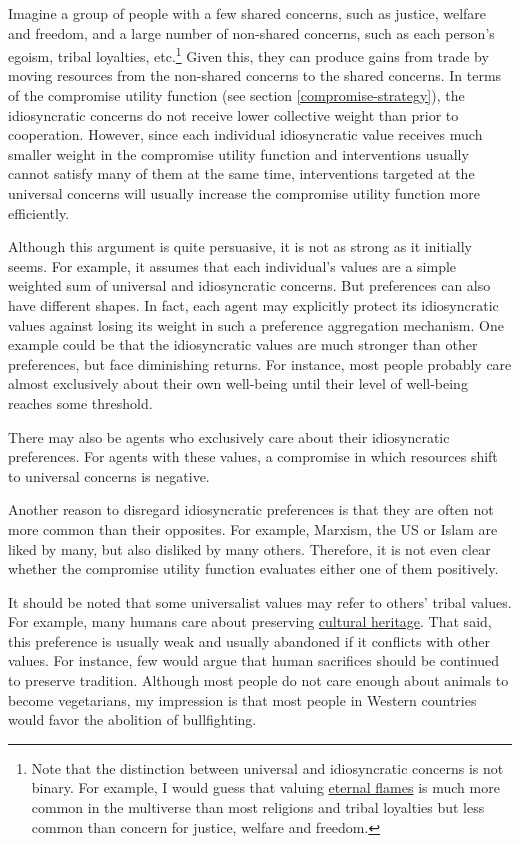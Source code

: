 Imagine a group of people with a few shared concerns, such as justice,
welfare and freedom, and a large number of non-shared concerns, such as
each person's egoism, tribal loyalties, etc.\footnote{Note that the
  distinction between universal and idiosyncratic concerns is not
  binary. For example, I would guess that valuing
  \href{https://en.wikipedia.org/wiki/Eternal_flame}{eternal
  flames} is much more common in the multiverse than most religions and
  tribal loyalties but less common than concern for justice, welfare and
  freedom.} Given this, they can produce gains from trade by moving
resources from the non-shared concerns to the shared concerns. In terms
of the compromise utility function (see section
\ref{compromise-strategy}), the idiosyncratic concerns do not receive lower
collective weight than prior to cooperation. However, since each
individual idiosyncratic value receives much smaller weight in the
compromise utility function and interventions usually cannot satisfy
many of them at the same time, interventions targeted at the universal
concerns will usually increase the compromise utility function more
efficiently.

Although this argument is quite persuasive, it is not as strong as it
initially seems. For example, it assumes that each individual's values
are a simple weighted sum of universal and idiosyncratic concerns. But
preferences can also have different shapes. In fact, each agent may
explicitly protect its idiosyncratic values against losing its weight in
such a preference aggregation mechanism. One example could be that the
idiosyncratic values are much stronger than other preferences, but face
diminishing returns. For instance, most people probably care almost
exclusively about their own well-being until their level of well-being
reaches some threshold.

There may also be agents who exclusively care about their idiosyncratic
preferences. For agents with these values, a compromise in which
resources shift to universal concerns is negative.

Another reason to disregard idiosyncratic preferences is that they are
often not more common than their opposites. For example, Marxism, the US
or Islam are liked by many, but also disliked by many others. Therefore,
it is not even clear whether the compromise utility function evaluates
either one of them positively.

It should be noted that some universalist values may refer to others'
tribal values. For example, many humans care about preserving
\href{https://en.wikipedia.org/wiki/Cultural_heritage}{cultural
heritage}. That said, this preference is usually weak and usually
abandoned if it conflicts with other values. For instance, few would
argue that human sacrifices should be continued to preserve tradition.
Although most people do not care enough about animals to become
vegetarians, my impression is that most people in Western countries
would favor the abolition of bullfighting.

